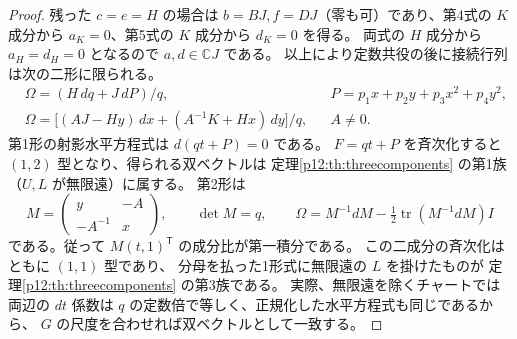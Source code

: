 \begin{proof}
残った $c=e=H$ の場合は $b=BJ,f=DJ$（零も可）であり、第4式の
$K$ 成分から $a_K=0$、第5式の $K$ 成分から $d_K=0$ を得る。
両式の $H$ 成分から $a_H=d_H=0$ となるので $a,d\in\mathbb CJ$ である。
以上により定数共役の後に接続行列は次の二形に限られる。
\begin{align*}
 &\Omega=(H\,dq+J\,dP)/q,
    &&P=p_1x+p_2y+p_3 x^2+p_4 y^2,\\
 &\Omega=\big[(AJ-Hy)\,dx+(A^{-1}K+Hx)\,dy\big]/q,
    &&A\ne0.
\end{align*}
第1形の射影水平方程式は $d(qt+P)=0$ である。
$F=qt+P$ を斉次化すると $(1,2)$ 型となり、得られる双ベクトルは
定理\ref{p12:th:threecomponents} の第1族（$U,L$ が無限遠）に属する。
第2形は
\[
 M=\begin{pmatrix}y&-A\\-A^{-1}&x\end{pmatrix},\qquad
 \det M=q,\qquad
 \Omega=M^{-1}dM-\tfrac12\operatorname{tr}(M^{-1}dM)I
\]
である。従って $M(t,1)^{\mathsf T}$ の成分比が第一積分である。
この二成分の斉次化はともに $(1,1)$ 型であり、
分母を払った1形式に無限遠の $L$ を掛けたものが
定理\ref{p12:th:threecomponents} の第3族である。
実際、無限遠を除くチャートでは両辺の $dt$ 係数は
$q$ の定数倍で等しく、正規化した水平方程式も同じであるから、
$G$ の尺度を合わせれば双ベクトルとして一致する。
\end{proof}

